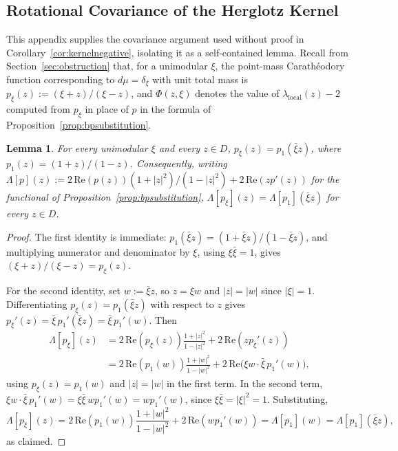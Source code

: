 \documentclass[pdflatex,sn-mathphys-num]{sn-jnl}%
\theoremstyle{thmstyleone}%
\theoremstyle{thmstyletwo}%
\theoremstyle{thmstylethree}%
\newtheorem{lemma}{Lemma} %
\begin{document}
\begin{appendices}

\section{Rotational Covariance of the Herglotz Kernel}\label{secA1}

This appendix supplies the covariance argument used without proof in Corollary~\ref{cor:kernelnegative}, isolating it as a self-contained lemma. Recall from Section~\ref{sec:obstruction} that, for a unimodular $\xi$, the point-mass Carath\'eodory function corresponding to $d\mu=\delta_\xi$ with unit total mass is $p_\xi(z):=(\xi+z)/(\xi-z)$, and $\Phi(z,\xi)$ denotes the value of $\lambda_{\mathrm{local}}(z)-2$ computed from $p_\xi$ in place of $p$ in the formula of Proposition~\ref{prop:bpsubstitution}.

\begin{lemma}
\label{lem:covariance}
For every unimodular $\xi$ and every $z\in D$, $p_\xi(z)=p_1(\bar\xi z)$, where $p_1(z)=(1+z)/(1-z)$. Consequently, writing $\Lambda[p](z):=2\,\mathrm{Re}(p(z))(1+|z|^2)/(1-|z|^2)+2\,\mathrm{Re}(zp'(z))$ for the functional of Proposition~\ref{prop:bpsubstitution}, $\Lambda[p_\xi](z)=\Lambda[p_1](\bar\xi z)$ for every $z\in D$.
\end{lemma}

\begin{proof}
The first identity is immediate: $p_1(\bar\xi z)=(1+\bar\xi z)/(1-\bar\xi z)$, and multiplying numerator and denominator by $\xi$, using $\xi\bar\xi=1$, gives $(\xi+z)/(\xi-z)=p_\xi(z)$.

For the second identity, set $w:=\bar\xi z$, so $z=\xi w$ and $|z|=|w|$ since $|\xi|=1$. Differentiating $p_\xi(z)=p_1(\bar\xi z)$ with respect to $z$ gives $p_\xi'(z)=\bar\xi\,p_1'(\bar\xi z)=\bar\xi\,p_1'(w)$. Then
\begin{align*}
\Lambda[p_\xi](z) &= 2\,\mathrm{Re}(p_\xi(z))\frac{1+|z|^2}{1-|z|^2} + 2\,\mathrm{Re}(zp_\xi'(z)) \\
&= 2\,\mathrm{Re}(p_1(w))\frac{1+|w|^2}{1-|w|^2} + 2\,\mathrm{Re}\big(\xi w\cdot\bar\xi\,p_1'(w)\big),
\end{align*}
using $p_\xi(z)=p_1(w)$ and $|z|=|w|$ in the first term. In the second term, $\xi w\cdot\bar\xi\,p_1'(w)=\xi\bar\xi\,wp_1'(w)=wp_1'(w)$, since $\xi\bar\xi=|\xi|^2=1$. Substituting,
\begin{equation*}
\Lambda[p_\xi](z) = 2\,\mathrm{Re}(p_1(w))\frac{1+|w|^2}{1-|w|^2} + 2\,\mathrm{Re}(wp_1'(w)) = \Lambda[p_1](w) = \Lambda[p_1](\bar\xi z),
\end{equation*}
as claimed.
\end{proof}


\end{appendices}
\end{document}
